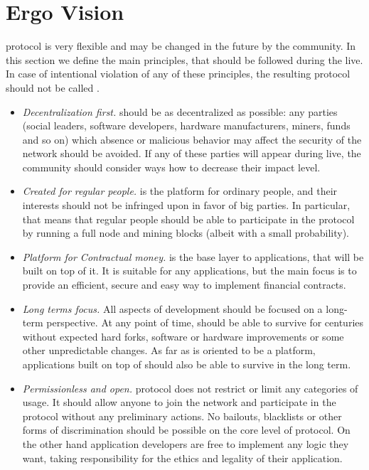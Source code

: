\section{Ergo Vision}
\label{sec:social}


\Ergo{} protocol is very flexible and may be changed in the future by the community.
In this section we define the main principles, that should be followed during the \Ergo{} live.
In case of intentional violation of any of these principles, the resulting protocol should not
be called \Ergo{}.

\begin{itemize}
    \item{\em Decentralization first.} \Ergo{} should be as decentralized as possible: any parties (social leaders, software developers, hardware manufacturers, miners, funds and so on)
    which absence or malicious behavior may affect the security of the network should be avoided.
    If any of these parties will appear during \Ergo{} live, the community should consider ways how to decrease their impact level.
    \item{\em Created for regular people.} \Ergo{} is the platform for ordinary people, and their interests should not be infringed upon in favor of big parties.
    In particular, that means that regular people should be able to participate in the protocol by running a full node and mining blocks (albeit with a small probability).
    \item{\em Platform for Contractual money.} \Ergo{} is the base layer to applications, that will be built on top of it.
    It is suitable for any applications, but the main focus is to provide an efficient, secure and easy way to implement financial contracts.
    \item{\em Long terms focus.} All aspects of \Ergo{} development should be focused on a long-term perspective.
    At any point of time, \Ergo{} should be able to survive for centuries without expected hard forks,
    software or hardware improvements or some other unpredictable changes. As far as \Ergo{} is oriented to be a platform, applications built on top of \Ergo{} should also be able to survive in the long term.
    \item{\em Permissionless and open.} \Ergo{} protocol does not restrict or limit any categories of usage.
    It should allow anyone to join the network and participate in the protocol without any preliminary actions.
    No bailouts, blacklists or other forms of discrimination should be possible on the core level of \Ergo{} protocol.
    On the other hand application developers are free to implement any logic they want, taking responsibility for the ethics and legality of their application.
\end{itemize}
